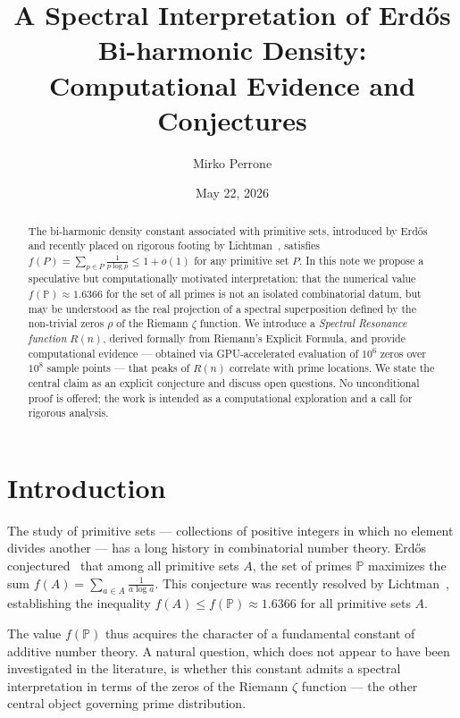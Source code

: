 \documentclass[11pt,a4paper]{article}
\title{\textbf{A Spectral Interpretation of Erd\H{o}s Bi-harmonic Density:\\
Computational Evidence and Conjectures}}
\author{Mirko Perrone}
\date{May 22, 2026}
\begin{document}
\maketitle

\begin{abstract}
The bi-harmonic density constant associated with primitive sets, introduced by Erd\H{o}s
and recently placed on rigorous footing by Lichtman~\cite{lichtman2019}, satisfies
$f(P) = \sum_{p \in P} \frac{1}{p \log p} \leq 1 + o(1)$ for any primitive set $P$.
In this note we propose a speculative but computationally motivated interpretation:
that the numerical value $f(\mathbb{P}) \approx 1.6366$ for the set of all primes
is not an isolated combinatorial datum, but may be understood as the real projection
of a spectral superposition defined by the non-trivial zeros $\rho$ of the Riemann
$\zeta$ function. We introduce a \emph{Spectral Resonance function} $R(n)$, derived
formally from Riemann's Explicit Formula, and provide computational evidence ---
obtained via GPU-accelerated evaluation of $10^6$ zeros over $10^8$ sample points ---
that peaks of $R(n)$ correlate with prime locations. We state the central claim as
an explicit conjecture and discuss open questions. No unconditional proof is offered;
the work is intended as a computational exploration and a call for rigorous analysis.
\end{abstract}

\section{Introduction}

The study of primitive sets --- collections of positive integers in which no element
divides another --- has a long history in combinatorial number theory. Erd\H{o}s
conjectured~\cite{erdos1988} that among all primitive sets $A$, the set of primes
$\mathbb{P}$ maximizes the sum $f(A) = \sum_{a \in A} \frac{1}{a \log a}$.
This conjecture was recently resolved by Lichtman~\cite{lichtman2019}, establishing
the inequality $f(A) \leq f(\mathbb{P}) \approx 1.6366$ for all primitive sets $A$.

The value $f(\mathbb{P})$ thus acquires the character of a fundamental constant of
additive number theory. A natural question, which does not appear to have been
investigated in the literature, is whether this constant admits a spectral
interpretation in terms of the zeros of the Riemann $\zeta$ function --- the other
central object governing prime distribution.
\end{document}
